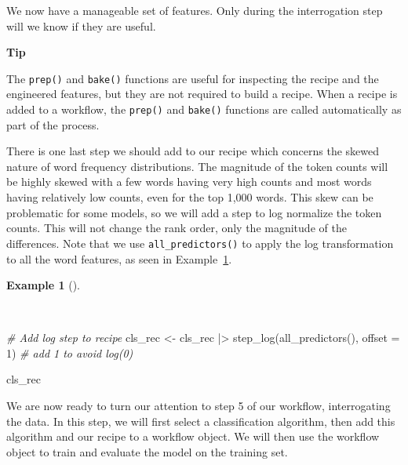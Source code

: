 \documentclass[
  letterpaper,
  DIV=11,
  numbers=noendperiod]{scrreprt}
\newenvironment{Shaded}{\begin{snugshade}}{\end{snugshade}}
\newcommand{\AttributeTok}[1]{\textcolor[rgb]{0.00,0.00,0.00}{#1}}
\newcommand{\CommentTok}[1]{\textcolor[rgb]{0.00,0.00,0.00}{\textit{#1}}}
\newcommand{\DecValTok}[1]{\textcolor[rgb]{0.00,0.00,0.00}{#1}}
\newcommand{\FunctionTok}[1]{\textcolor[rgb]{0.00,0.00,0.00}{#1}}
\newcommand{\NormalTok}[1]{\textcolor[rgb]{0.00,0.00,0.00}{#1}}
\newcommand{\OtherTok}[1]{\textcolor[rgb]{0.00,0.00,0.00}{#1}}
\newcommand{\SpecialCharTok}[1]{\textcolor[rgb]{0.00,0.00,0.00}{#1}}
\theoremstyle{definition}
\newtheorem{example}{Example}[chapter]
\theoremstyle{remark}
\begin{document}
We now have a manageable set of features. Only during the interrogation
step will we know if they are useful.

\begin{tcolorbox}[enhanced jigsaw, leftrule=.75mm, colframe=quarto-callout-color-frame, colback=white, rightrule=.15mm, opacityback=0, arc=.35mm, breakable, bottomrule=.15mm, left=2mm, toprule=.15mm]

\textbf{ Tip}

The \texttt{prep()} and \texttt{bake()} functions are useful for
inspecting the recipe and the engineered features, but they are not
required to build a recipe. When a recipe is added to a workflow, the
\texttt{prep()} and \texttt{bake()} functions are called automatically
as part of the process.

\end{tcolorbox}

There is one last step we should add to our recipe which concerns the
skewed nature of word frequency distributions. The magnitude of the
token counts will be highly skewed with a few words having very high
counts and most words having relatively low counts, even for the top
1,000 words. This skew can be problematic for some models, so we will
add a step to log normalize the token counts. This will not change the
rank order, only the magnitude of the differences. Note that we use
\texttt{all\_predictors()} to apply the log transformation to all the
word features, as seen in Example~\ref{exm-pda-class-recipe-log}.

\begin{example}[]\protect\hypertarget{exm-pda-class-recipe-log}{}\label{exm-pda-class-recipe-log}

~

\begin{Shaded}
\begin{Highlighting}[]
\CommentTok{\# Add log step to recipe}
\NormalTok{cls\_rec }\OtherTok{\textless{}{-}}
\NormalTok{  cls\_rec }\SpecialCharTok{|\textgreater{}}
  \FunctionTok{step\_log}\NormalTok{(}\FunctionTok{all\_predictors}\NormalTok{(), }\AttributeTok{offset =} \DecValTok{1}\NormalTok{) }\CommentTok{\# add 1 to avoid log(0)}

\NormalTok{cls\_rec}
\end{Highlighting}
\end{Shaded}

\end{example}

We are now ready to turn our attention to step 5 of our workflow,
interrogating the data. In this step, we will first select a
classification algorithm, then add this algorithm and our recipe to a
workflow object. We will then use the workflow object to train and
evaluate the model on the training set.
\end{document}
